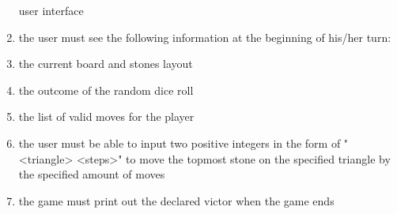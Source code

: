 \documentclass[11pt]{article}
\begin{document}
\begin{enumerate}[I]
user interface
\item the user must see the following information at the beginning of his/her turn:

\item the current board and stones layout
\item the outcome of the random dice roll
\item the list of valid moves for the player

\item the user must be able to input two positive integers in the form of "<triangle> <steps>" to move the topmost stone on the specified triangle by the specified amount of moves
\item the game must print out the declared victor when the game ends
\end{enumerate}
\end{document}
